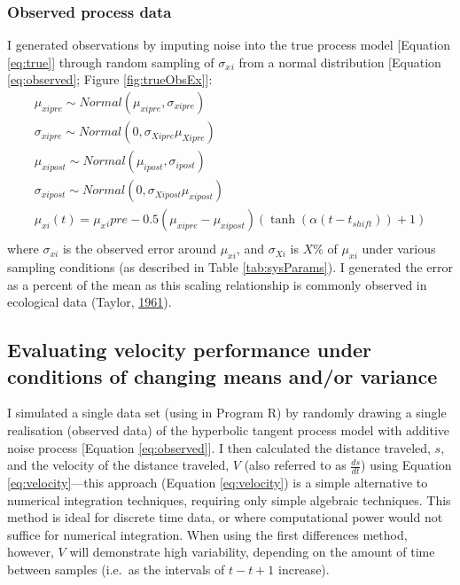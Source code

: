 \documentclass[12pt,twoside,openany]{reedthesis}
\begin{document}
\hypertarget{observed-process-data}{%
\subsubsection{Observed process data}\label{observed-process-data}}

I generated observations by imputing noise into the true process model {[}Equation \eqref{eq:true}{]} through random sampling of \(\sigma_x{_i}\) from a normal distribution {[}Equation \eqref{eq:observed}; Figure \ref{fig:trueObsEx}{]}:
\begin{equation}
\begin{array}{rcl}
\mu_{xipre}\sim Normal(\mu_{xipre},\sigma_{xipre}) \\ 
\sigma_{xipre} \sim Normal(0,\sigma_{Xipre}\mu_{Xipre}) \\
\mu_{xipost} \sim Normal(\mu_{ipost},\sigma_{ipost}) \\ 
\sigma_{xipost} \sim Normal(0,\sigma_{Xipost}\mu_{xipost}) \\
\mu_{xi}(t) = \mu_x{_ipre}  - 0.5(\mu_{xipre}-\mu_{xipost})(\tanh(\alpha (t-t_{shift}))+1) \\
\end{array}
\label{eq:observed}
\end{equation}
where \(\sigma_{xi}\) is the observed error around \(\mu_{xi}\), and \(\sigma_{Xi}\) is \(X\%\) of \(\mu_{xi}\) under various sampling conditions (as described in Table \ref{tab:sysParams}). I generated the error as a percent of the mean as this scaling relationship is commonly observed in ecological data (Taylor, \protect\hyperlink{ref-taylor1961aggregation}{1961}).

\hypertarget{evaluating-velocity-performance-under-conditions-of-changing-means-andor-variance}{%
\subsection{Evaluating velocity performance under conditions of changing means and/or variance}\label{evaluating-velocity-performance-under-conditions-of-changing-means-andor-variance}}

I simulated a single data set (using in Program R) by randomly drawing a single realisation (observed data) of the hyperbolic tangent process model with additive noise process {[}Equation \eqref{eq:observed}{]}. I then calculated the distance traveled, \(s\), and the velocity of the distance traveled, \(V\) (also referred to as \(\frac{ds}{dt}\)) using Equation \eqref{eq:velocity}---this approach (Equation \eqref{eq:velocity}) is a simple alternative to numerical integration techniques, requiring only simple algebraic techniques. This method is ideal for discrete time data, or where computational power would not suffice for numerical integration. When using the first differences method, however, \(V\) will demonstrate high variability, depending on the amount of time between samples (i.e.~as the intervals of \(t-t+1\) increase).
\end{document}
